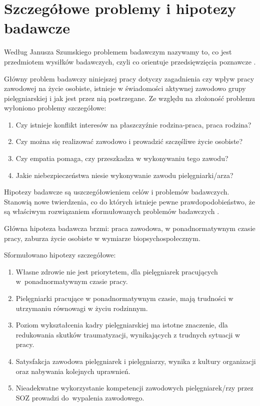 \documentclass[a4paper,12pt,twoside,openright]{mwrep}
\begin{document}
\section{Szczegółowe problemy i hipotezy badawcze}
Według Janusza Szumskiego problemem badawczym nazywamy to, co jest przedmiotem wysiłków badawczych, czyli co orientuje przedsięwzięcia poznawcze \cite{janusz}.

Główny problem badawczy niniejszej pracy dotyczy zagadnienia czy wpływ pracy zawodowej na życie osobiste, istnieje w świadomości aktywnej zawodowo grupy pielęgniarskiej i jak jest przez nią postrzegane. Ze względu na złożoność problemu wyłoniono problemy szczegółowe:
\begin{enumerate}
	\item Czy istnieje konflikt interesów na płaszczyźnie rodzina-praca, praca rodzina?
	\item Czy można się realizować zawodowo i prowadzić szczęśliwe życie osobiste?
	\item Czy empatia pomaga, czy przeszkadza w wykonywaniu tego zawodu?
	\item Jakie niebezpieczeństwa niesie wykonywanie zawodu pielęgniarki/arza?
\end{enumerate}

Hipotezy badawcze są uszczegółowieniem celów i problemów badawczych. Stanowią nowe twierdzenia, co do których istnieje pewne prawdopodobieństwo, że są właściwym rozwiązaniem sformułowanych problemów badawczych \cite{janusz}.

Główna hipoteza badawcza brzmi: praca zawodowa, w ponadnormatywnym czasie pracy, zaburza życie osobiste w wymiarze biopsychospołecznym.

Sformułowano hipotezy szczegółowe:
\begin{enumerate}
	\item Własne zdrowie nie jest priorytetem, dla pielęgniarek pracujących w~ponadnormatywnym czasie pracy.
	\item Pielęgniarki pracujące w ponadnormatywnym czasie, mają  trudności w utrzymaniu równowagi w życiu  rodzinnym. 
	\item Poziom wykształcenia kadry pielęgniarskiej ma istotne znaczenie, dla redukowania skutków traumatyzacji, wynikających z trudnych sytuacji w pracy.
	\item Satysfakcja zawodowa pielęgniarek i pielęgniarzy, wynika z kultury organizacji oraz nabywania kolejnych uprawnień.
	\item Nieadekwatne wykorzystanie kompetencji zawodowych pielęgniarek/rzy  przez SOZ prowadzi do~wypalenia zawodowego.
\end{enumerate}
\end{document}
